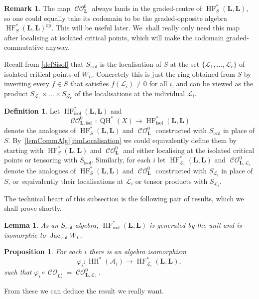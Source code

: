 \documentclass[JEP,XML,SOM,Unicode,NoEqCountersInSection,NoFloatCountersInSection,published]{cedram}
\newtheorem{lemma}[theorem]{Lemma}
\newtheorem{proposition}[theorem]{Proposition}
\theoremstyle{definition}
\newtheorem{definition}[theorem]{Definition}
\newtheorem{remark}[theorem]{Remark}
\let\phi\varphi
\newcommand{\LL}{L^\flat}
\newcommand{\calA}{\mathcal{A}}
\newcommand{\calL}{\mathcal{L}}
\newcommand{\bL}{{\boldsymbol{L}}}
\newcommand{\op}{\mathrm{op}}
\newcommand{\isol}{\mathrm{isol}}
\newcommand{\HH}{\operatorname{HH}}
\newcommand{\HF}{\operatorname{HF}}
\newcommand{\CO}{\operatorname{\mathcal{CO}}}
\newcommand{\QH}{\operatorname{QH}}
\newcommand{\Jacisol}{\operatorname{Jac}_\isol}
\newcommand{\COisol}{\CO^0_{\bL, \isol}}
\begin{document}
\begin{remark}
\label{opposite}
The map $\CO^0_\bL$ always lands in the graded-centre of $\HF^*_S(\bL, \bL)$, so one could equally take its codomain to be the graded-opposite algebra $\HF^*_S(\bL, \bL)^\op$. This will be useful later. We~shall really only need this map after localising at isolated critical points, which will make the codomain graded-commutative anyway.
\end{remark}

Recall from \cref{defSisol} that $S_\isol$ is the localisation of $S$ at the set $\{\calL_1, \dots, \calL_r\}$ of isolated critical points of $W_L$. Concretely this is just the ring obtained from $S$ by inverting every $f \in S$ that satisfies $f(\calL_i) \neq 0$ for all $i$, and can be viewed as the product $S_{\calL_1} \times \dots \times S_{\calL_r}$ of the localisations at the individual $\calL_i$.

\begin{definition}
\label{defHFisol}
Let $\HF^*_\isol(\bL, \bL)$ and
\[
\COisol : \QH^*(X) \to \HF^*_\isol(\bL, \bL)
\]
denote the analogues of $\HF^*_S(\bL, \bL)$ and $\CO^0_\bL$ constructed with $S_\isol$ in place of $S$. By~\cref{lemCommAlg}\eqref{itmLocalisation} we could equivalently define them by starting with $\HF^*_S(\bL, \bL)$ and $\CO^0_\bL$ and either localising at the isolated critical points or tensoring with $S_\isol$. Similarly, for each $i$ let $\HF^*_{\calL_i}(\bL, \bL)$ and $\CO^0_{\bL, \calL_i}$ denote the analogues of $\HF^*_S(\bL, \bL)$ and $\CO^0_\bL$ constructed with $S_{\calL_i}$ in place of $S$, or~equivalently their localisations at $\calL_i$ or tensor products with $S_{\calL_i}$.
\end{definition}

The technical heart of this subsection is the following pair of results, which we shall prove shortly.

\begin{lemma}
\label{lemJacisol}
As an $S_\isol$-algebra, $\HF^*_\isol(\bL, \bL)$ is generated by the unit and is isomorphic to $\Jacisol W_L$.
\end{lemma}

\begin{proposition}
\label{propphii}
For each $i$ there is an algebra isomorphism
\[
\phi_i : \HH^*(\calA_i) \to \HF^*_{\calL_i}(\bL, \bL),
\]
such that $\phi_i \circ \CO_{\LL_i} = \CO^0_{\bL, \calL_i}$.
\end{proposition}

From these we can deduce the result we really want.
\end{document}
